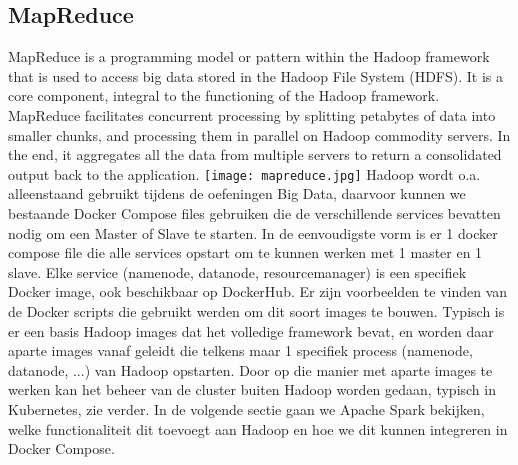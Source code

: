 \subsection{MapReduce}
MapReduce is a programming model or pattern within the Hadoop framework that is used to access big data stored in the Hadoop File System (HDFS). It is a core component, integral to the functioning of the Hadoop framework.
MapReduce facilitates concurrent processing by splitting petabytes of data into smaller chunks, and processing them in parallel on Hadoop commodity servers. In the end, it aggregates all the data from multiple servers to return a consolidated output back to the application.\autocite{Talend2023}
\newline
\texttt{[image: mapreduce.jpg]}
\newline
\newline
Hadoop wordt o.a. alleenstaand gebruikt tijdens de oefeningen Big Data, daarvoor kunnen we bestaande Docker Compose files gebruiken die de verschillende services bevatten nodig om een Master of Slave te starten.
In de eenvoudigste vorm is er 1 docker compose file die alle services opstart om te kunnen werken met 1 master en 1 slave.
\newline
\newline
Elke service (namenode, datanode, resourcemanager) is een specifiek Docker image, ook beschikbaar op DockerHub. Er zijn voorbeelden te vinden van de Docker scripts die gebruikt werden om dit soort images te bouwen. Typisch is er een basis Hadoop images dat het volledige framework bevat, en worden daar aparte images vanaf geleidt die telkens maar 1 specifiek process (namenode, datanode, ...) van Hadoop opstarten.
Door op die manier met aparte images te werken kan het beheer van de cluster buiten Hadoop worden gedaan, typisch in Kubernetes, zie verder.
\newline
\newline
In de volgende sectie gaan we Apache Spark bekijken, welke functionaliteit dit toevoegt aan Hadoop en hoe we dit kunnen integreren in Docker Compose.


